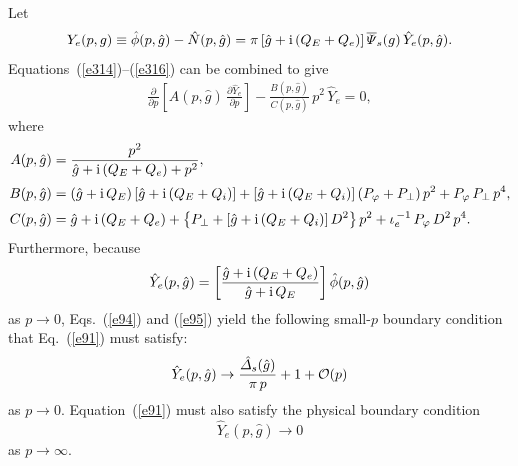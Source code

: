 \documentclass[12pt,prb,aps]{revtex4-1}
\begin{document}
Let 
\begin{align}\label{e95}
Y_e(p,g)\equiv \hat{\phi}(p,\hat{g})-\hat{N}(p,\hat{g})= \pi\,[\hat{g}+{ \rm i}\,(Q_E+Q_e)]\,\overline{\mit\Psi}_s(g)\,\hat{Y}_e(p,\hat{g}).
\end{align}
 Equations~(\ref{e314})--(\ref{e316}) can be combined to give 
\begin{align}\label{e91}
\frac{\partial}{\partial p}\!\left[A(p,\hat{g})\,\frac{\partial \hat{Y}_e}{\partial p}\right] - \frac{B(p,\hat{g})}{C(p,\hat{g})}\,p^2\,\hat{Y}_e=0,
\end{align}
where
\begin{align}
A(p,\hat{g}) &= \frac{p^2}{\hat{g}+{\rm i}\,(Q_E+Q_e)+p^2},\label{e97a}\\[0.5ex]
B(p,\hat{g})&= (\hat{g}+{\rm i}\,Q_E)\,[\hat{g}+{\rm i}\,(Q_E+Q_i)] + [\hat{g}+{\rm i}\,(Q_E+Q_i)]\,(P_\varphi+P_\perp)\,p^2 + P_\varphi\,P_\perp\,p^4,\\[0.5ex]
C(p,\hat{g}) &= \hat{g}+{\rm i}\,(Q_E+Q_e)+ \left\{P_\perp
+[\hat{g}+{\rm i}\,(Q_E+Q_i)]\,D^2\right\}p^2 + \iota_e^{\,-1}\,P_\varphi\,D^2\,p^4.\label{e97c}
\end{align}
Furthermore, because
\begin{equation}
\hat{Y}_e(p,\hat{g}) = \left[\frac{\hat{g}+{\rm i}\,(Q_E+Q_e)}{\hat{g}+{\rm i}\,Q_E}\right]\hat{\phi}(p,\hat{g})
\end{equation}
as $p\rightarrow 0$, Eqs.~(\ref{e94}) and (\ref{e95})
yield the following small-$p$ boundary condition that Eq.~(\ref{e91}) must satisfy:\,\cite{ed}
\begin{equation}\label{e101}
\hat{Y}_e(p,\hat{g})\rightarrow\frac{\hat{\mit\Delta}_s(\hat{g})}{\pi\,p} + 1+ {\cal O}(p)
\end{equation}
as $p\rightarrow 0$.  Equation~(\ref{e91}) must also satisfy the  physical boundary condition 
\begin{equation}\label{e102}
\hat{Y}_e(p,\hat{g})\rightarrow 0
\end{equation}
as $p\rightarrow\infty$. 
\end{document}
